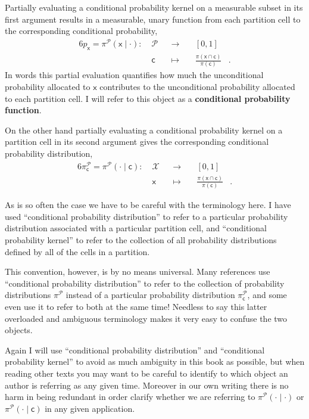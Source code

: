 \documentclass[
  letterpaper,
  DIV=11,
  numbers=noendperiod]{scrartcl}
\begin{document}
Partially evaluating a conditional probability kernel on a measurable
subset in its first argument results in a measurable, unary function
from each partition cell to the corresponding conditional probability,
\begin{alignat*}{6}
p_{\mathsf{x}}
=
\pi^{\mathcal{P}}( \mathsf{x} \mid \cdot )
:\; &\mathcal{P}& &\rightarrow& \; &[0, 1]&
\\
&\mathsf{c}& &\mapsto&
&\frac{ \pi(\mathsf{x} \cap \mathsf{c}) }{ \pi (\mathsf{c}) }&.
\end{alignat*} In words this partial evaluation quantifies how much the
unconditional probability allocated to \(\mathsf{x}\) contributes to the
unconditional probability allocated to each partition cell. I will refer
to this object as a \textbf{conditional probability function}.

On the other hand partially evaluating a conditional probability kernel
on a partition cell in its second argument gives the corresponding
conditional probability distribution, \begin{alignat*}{6}
\pi^{\mathcal{P}}_{\mathsf{c}}
=
\pi^{\mathcal{P}}( \cdot \mid \mathsf{c} )
:\; &\mathcal{X}& &\rightarrow& \; &[0, 1]&
\\
&\mathsf{x}& &\mapsto&
&\frac{ \pi(\mathsf{x} \cap \mathsf{c}) }{ \pi (\mathsf{c}) }&.
\end{alignat*}

As is so often the case we have to be careful with the terminology here.
I have used ``conditional probability distribution'' to refer to a
particular probability distribution associated with a particular
partition cell, and ``conditional probability kernel'' to refer to the
collection of all probability distributions defined by all of the cells
in a partition.

This convention, however, is by no means universal. Many references use
``conditional probability distribution'' to refer to the collection of
probability distributions \(\pi^{\mathcal{P}}\) instead of a particular
probability distribution \(\pi^{\mathcal{P}}_{\mathsf{c}}\), and some
even use it to refer to both at the same time! Needless to say this
latter overloaded and ambiguous terminology makes it very easy to
confuse the two objects.

Again I will use ``conditional probability distribution'' and
``conditional probability kernel'' to avoid as much ambiguity in this
book as possible, but when reading other texts you may want to be
careful to identify to which object an author is referring as any given
time. Moreover in our own writing there is no harm in being redundant in
order clarify whether we are referring to
\(\pi^{\mathcal{P}}( \cdot \mid \cdot )\) or
\(\pi^{\mathcal{P}}( \cdot \mid \mathsf{c} )\) in any given application.
\end{document}

